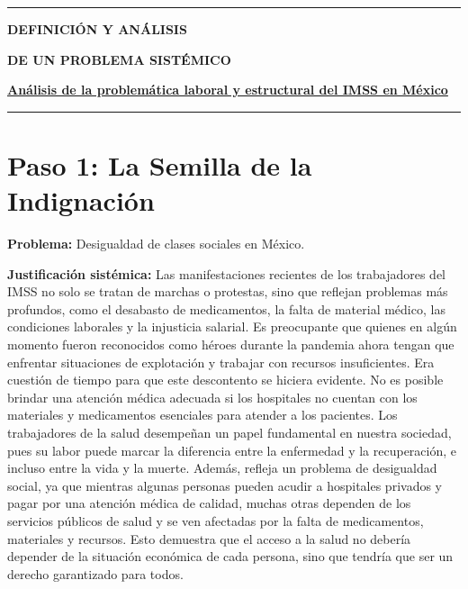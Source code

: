 \documentclass[12pt,letterpaper]{article}
\begin{document}
\begin{center}
\vspace*{0.5cm}
{\color{azultitulo}\rule{\textwidth}{1.5pt}}\par
\vspace{0.45cm}
{\Huge\bfseries\color{azultitulo} DEFINICIÓN Y ANÁLISIS\par}
\vspace{0.15cm}
{\LARGE\bfseries\color{azultitulo} DE UN PROBLEMA SISTÉMICO\par}
\vspace{0.3cm}
{\Large\bfseries\color{azullink}\uline{Análisis de la problemática laboral y estructural del IMSS en México}\par}
\vspace{0.45cm}
{\color{azultitulo}\rule{\textwidth}{1.5pt}}\par
\end{center}

\section*{Paso 1: La Semilla de la Indignación}

\textbf{Problema:} Desigualdad de clases sociales en México.

\textbf{Justificación sistémica:} Las manifestaciones recientes de los trabajadores del IMSS no solo se tratan de marchas o protestas, sino que reflejan problemas más profundos, como el desabasto de medicamentos, la falta de material médico, las condiciones laborales y la injusticia salarial. Es preocupante que quienes en algún momento fueron reconocidos como héroes durante la pandemia ahora tengan que enfrentar situaciones de explotación y trabajar con recursos insuficientes. Era cuestión de tiempo para que este descontento se hiciera evidente. No es posible brindar una atención médica adecuada si los hospitales no cuentan con los materiales y medicamentos esenciales para atender a los pacientes. Los trabajadores de la salud desempeñan un papel fundamental en nuestra sociedad, pues su labor puede marcar la diferencia entre la enfermedad y la recuperación, e incluso entre la vida y la muerte. Además, refleja un problema de desigualdad social, ya que mientras algunas personas pueden acudir a hospitales privados y pagar por una atención médica de calidad, muchas otras dependen de los servicios públicos de salud y se ven afectadas por la falta de medicamentos, materiales y recursos. Esto demuestra que el acceso a la salud no debería depender de la situación económica de cada persona, sino que tendría que ser un derecho garantizado para todos.
\end{document}
